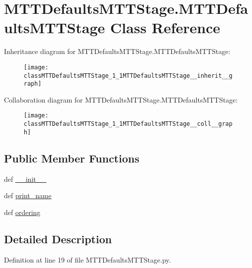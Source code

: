 \hypertarget{classMTTDefaultsMTTStage_1_1MTTDefaultsMTTStage}{\section{M\-T\-T\-Defaults\-M\-T\-T\-Stage.\-M\-T\-T\-Defaults\-M\-T\-T\-Stage Class Reference}
\label{classMTTDefaultsMTTStage_1_1MTTDefaultsMTTStage}
}


Inheritance diagram for M\-T\-T\-Defaults\-M\-T\-T\-Stage.\-M\-T\-T\-Defaults\-M\-T\-T\-Stage\-:\nopagebreak
\begin{figure}[H]
\begin{center}
\leavevmode
\texttt{[image: classMTTDefaultsMTTStage\_1\_1MTTDefaultsMTTStage\_\_inherit\_\_graph]}
\end{center}
\end{figure}


Collaboration diagram for M\-T\-T\-Defaults\-M\-T\-T\-Stage.\-M\-T\-T\-Defaults\-M\-T\-T\-Stage\-:\nopagebreak
\begin{figure}[H]
\begin{center}
\leavevmode
\texttt{[image: classMTTDefaultsMTTStage\_1\_1MTTDefaultsMTTStage\_\_coll\_\_graph]}
\end{center}
\end{figure}
\subsection*{Public Member Functions}
\begin{DoxyCompactItemize}
\item 
def \hyperlink{classMTTDefaultsMTTStage_1_1MTTDefaultsMTTStage_a6c55c9c9376337e6b24e794ee67e110f}{\-\_\-\-\_\-init\-\_\-\-\_\-}
\item 
def \hyperlink{classMTTDefaultsMTTStage_1_1MTTDefaultsMTTStage_a663155b4978b0ef68eb37cd48bfe214f}{print\-\_\-name}
\item 
def \hyperlink{classMTTDefaultsMTTStage_1_1MTTDefaultsMTTStage_a6b59aacb67bdbd184aedd2241c4d83ba}{ordering}
\end{DoxyCompactItemize}


\subsection{Detailed Description}


Definition at line 19 of file M\-T\-T\-Defaults\-M\-T\-T\-Stage.\-py.



